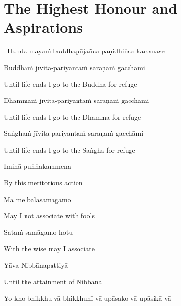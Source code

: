 \section{The Highest Honour and Aspirations}
\label{highest-honour-aspirations}

\begin{leader}
  \anglebracketleft\ \hspace{-0.5mm}Handa mayaṁ buddhapūjañca paṇidhiñca karomase \hspace{-0.5mm}\anglebracketright\
\end{leader}

Buddhaṁ jīvita-pariyantaṁ saraṇaṁ gacchāmi

\begin{english}
  Until life ends I go to the Buddha for refuge
\end{english}

Dhammaṁ jīvita-pariyantaṁ saraṇaṁ gacchāmi

\begin{english}
  Until life ends I go to the Dhamma for refuge
\end{english}

Saṅghaṁ jīvita-pariyantaṁ saraṇaṁ gacchāmi

\begin{english}
  Until life ends I go to the Saṅgha for refuge
\end{english}

Iminā puññakammena

\begin{english}
  By this meritorious action
\end{english}

Mā me bālasamāgamo

\begin{english}
  May I not associate with fools
\end{english}

Sataṁ samāgamo hotu

\begin{english}
  With the wise may I associate
\end{english}

Yāva Nibbānapattiyā

\begin{english}
  Until the attainment of Nibbāna
\end{english}


Yo kho bhikkhu vā bhikkhunī vā upāsako vā upāsikā vā

